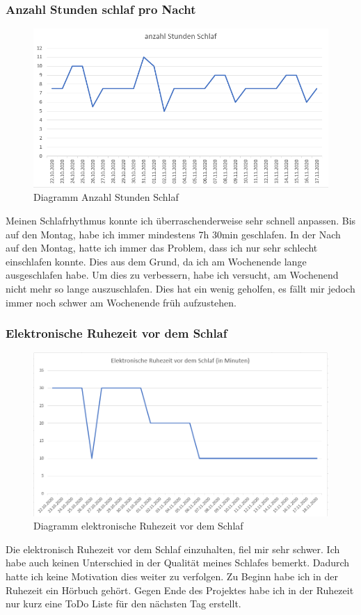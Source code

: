 \subsubsection{Anzahl Stunden schlaf pro Nacht}
\begin{figure}[H]
  \centering
  \includegraphics[width=0.7\linewidth]{./images/dario_schlaf.PNG}
  \caption{Diagramm Anzahl Stunden Schlaf}
\end{figure}
Meinen Schlafrhythmus konnte ich überraschenderweise sehr schnell anpassen. Bis auf den Montag, habe ich immer mindestens 7h 30min geschlafen. In der Nach auf den Montag, hatte ich immer das Problem, dass ich nur sehr schlecht einschlafen konnte. Dies aus dem Grund, da ich am Wochenende lange ausgeschlafen habe. Um dies zu verbessern, habe ich versucht, am Wochenend nicht mehr so lange auszuschlafen. Dies hat ein wenig geholfen, es fällt mir jedoch immer noch schwer am Wochenende früh aufzustehen.
\subsubsection{Elektronische Ruhezeit vor dem Schlaf}
\begin{figure}[H]
  \centering
  \includegraphics[width=0.7\linewidth]{./images/dario_ruhezeit.PNG}
  \caption{Diagramm elektronische Ruhezeit vor dem Schlaf}
\end{figure}
Die elektronisch Ruhezeit vor dem Schlaf einzuhalten, fiel mir sehr schwer.
\newline
Ich habe auch keinen Unterschied in der Qualität meines Schlafes bemerkt. Dadurch hatte ich keine Motivation dies weiter zu verfolgen.
\newline
Zu Beginn habe ich in der Ruhezeit ein Hörbuch gehört. Gegen Ende des Projektes habe ich in der Ruhezeit nur kurz eine ToDo Liste für den nächsten Tag erstellt.
